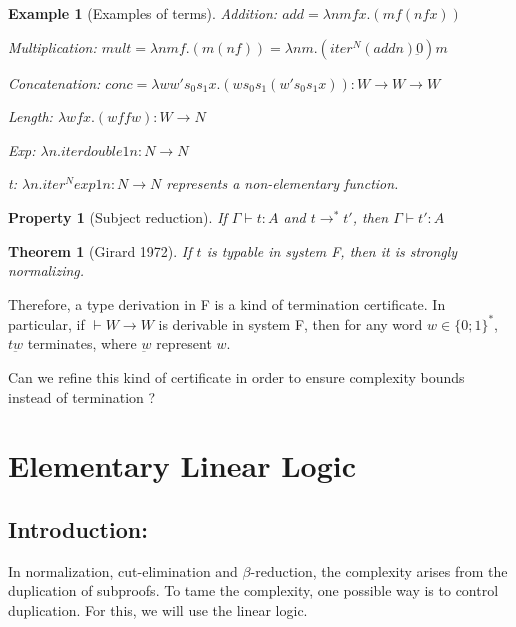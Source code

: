 \documentclass[a4paper,10pt]{article}
\newcommand{\impl}{\rightarrow}	%
\newtheorem{prop}{Property}
\newtheorem{thm}{Theorem}
\newtheorem{ex}{Example}
\begin{document}
\begin{ex}[Examples of terms]
\item Addition: $add = \lambda n m f x.(m f (n f x))$
\item Multiplication: $mult = \lambda n m f. (m (n f)) = \lambda n m.(iter^N (add n) \underbar{0}) m$
\item Concatenation: $conc = \lambda w w' s_0 s_1 x. (w s_0 s_1 (w' s_0 s_1 x)) : W \impl W \impl W$
\item Length: $\lambda w f x.(w f f w): W \impl N$
\item Exp: $\lambda n. iter double 1 n : N \impl N$
\item t: $\lambda n.iter^N exp 1 n: N \impl N$ represents a non-elementary function.
\end{ex}

\begin{prop}[Subject reduction]
If $\Gamma \vdash t:A$ and $t \rightarrow^{*} t'$, then $\Gamma \vdash t':A$
\end{prop}

\begin{thm}[Girard 1972]
If $t$ is typable in system F, then it is strongly normalizing.
\end{thm}

\par Therefore, a type derivation in F is a kind of termination certificate. In particular, if $\vdash W \impl W$ is derivable in system F, then for any word $w \in \{0;1\}^{*}$, $t \underbar{w}$ terminates, where $\underbar{w}$ represent $w$.

\par Can we refine this kind of certificate in order to ensure complexity bounds instead of termination ?



\newpage

\section{Elementary Linear Logic}

\subsection{Introduction:}
In normalization, cut-elimination and $\beta$-reduction, the complexity arises from the duplication of subproofs. To tame the complexity, one possible way is to control duplication. For this, we will use the linear logic.
\end{document}

